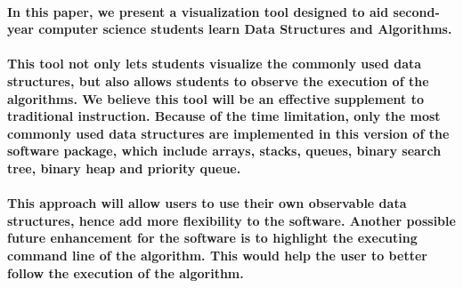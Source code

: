 \documentclass{article}
\begin{document}
\paragraph{In this paper, we present a visualization tool designed to aid second-year computer science students learn Data Structures and Algorithms.}
\paragraph{This tool not only lets students visualize the commonly used data structures, but also allows students to  observe the execution of the algorithms. We believe this tool will be an effective supplement to traditional instruction. Because of the time limitation, only the most commonly used data structures are implemented in this version of the software package, which include arrays, stacks, queues, binary search tree, binary heap and priority queue.} 
\paragraph{\cite{kreutz2015software}This approach will allow users to use their own observable data structures, hence add more flexibility to the software. Another possible future enhancement for the software is to highlight the executing command line of the algorithm. This would help the user to better follow the execution of the algorithm.}
 

\newpage


\end{document}
